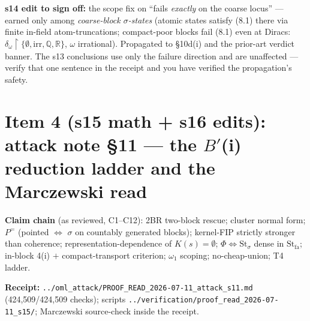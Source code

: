 \documentclass[11pt]{article}
\newcommand{\Stfa}{\mathrm{St}_{\mathrm{fa}}}
\newcommand{\Stsig}{\mathrm{St}_{\sigma}}
\newcommand{\file}[1]{\texttt{\small #1}}
\begin{document}
\smallskip\noindent\textbf{s14 edit to sign off:} the scope fix on
``fails \emph{exactly} on the coarse locus'' --- earned only among
\emph{coarse-block $\sigma$-states} (atomic states satisfy (8.1) there
via finite in-field atom-truncations; compact-poor blocks fail (8.1)
even at Diracs: $\delta_\omega\!\restriction\!\{\emptyset,
\mathrm{irr}, \mathbb Q, \mathbb R\}$, $\omega$ irrational).
Propagated to \S10d(i) and the prior-art verdict banner. The s13
conclusions use only the failure direction and are unaffected ---
verify that one sentence in the receipt and you have verified the
propagation's safety.

\section{Item 4 (s15 math + s16 edits): attack note \S11 --- the
$B'$(i) reduction ladder and the Marczewski read}

\noindent\textbf{Claim chain} (as reviewed, C1--C12): 2BR two-block
rescue; cluster normal form; $P^=$ (pointed $\Leftrightarrow$
$\sigma$ on countably generated blocks); kernel-FIP strictly stronger
than coherence; representation-dependence of $K(s) = \emptyset$;
$\Phi \Leftrightarrow \Stsig$ dense in $\Stfa$; in-block 4(i) $+$
compact-transport criterion; $\omega_1$ scoping; no-cheap-union;
T4 ladder.

\noindent\textbf{Receipt:} \file{../oml\_attack/PROOF\_READ\_2026-07-11\_attack\_s11.md}
(424{,}509/424{,}509 checks); scripts
\file{../verification/proof\_read\_2026-07-11\_s15/}; Marczewski
source-check inside the receipt.
\end{document}
